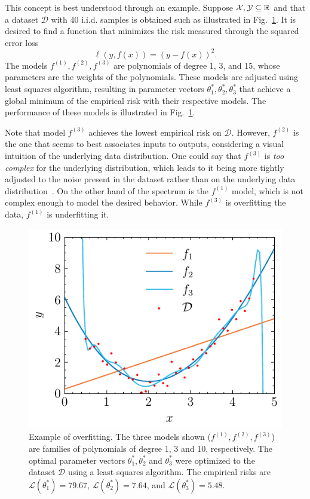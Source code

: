 This concept is best understood through an example.
Suppose $\mathcal{X},\mathcal{Y}\subseteq\mathbb{R}$ and that a dataset $\mathcal{D}$ with 40 i.i.d. samples is obtained such as illustrated in Fig.~\ref{fig:overfitting-example}.
It is desired to find a function that minimizes the risk measured through the squared error loss \[
    \ell(y,f(x)) = (y-f(x))^2
.\] 
The models $f^{(1)},f^{(2)},f^{(3)}$ are polynomials of degree 1, 3, and 15, whose parameters are the weights of the polynomials.
These models are adjusted using least squares algorithm, resulting in parameter vectors $\theta_1^*,\theta_2^*,\theta_3^*$ that achieve a global minimum of the empirical risk with their respective models.
The performance of these models is illustrated in Fig.~\ref{fig:overfitting-example}.

Note that model $f^{(3)}$ achieves the lowest empirical risk on $\mathcal{D}$.
However, $f^{(2)}$ is the one that seems to best associates inputs to outputs, considering a visual intuition of the underlying data distribution.
One could say that $f^{(3)}$ is \emph{too complex} for the underlying distribution, which leads to it being more tightly adjusted to the noise present in the dataset rather than on the underlying data distribution~\cite{murphyMachineLearningProbabilistic2013}.
On the other hand of the spectrum is the $f^{(1)}$ model, which is not complex enough to model the desired behavior.
While $f^{(3)}$ is overfitting the data, $f^{(1)}$ is underfitting it.

\begin{figure}[h]
    \centering
    \includegraphics{pictures/overfitting.pdf}
    \caption{Example of overfitting. The three models shown ($f^{(1)},f^{(2)},f^{(3)}$) are families of polynomials of degree 1, 3 and 10, respectively. The optimal parameter vectors $\theta_1^*,\theta_2^*$ and $\theta_3^*$ were optimized to the dataset $\mathcal{D}$ using a least squares algorithm. The empirical risks are $\mathcal{L}(\theta_1^*)=79.67$, $\mathcal{L}(\theta_2^*)=7.64$, and $\mathcal{L}(\theta_3^*)=5.48$.}
    \label{fig:overfitting-example}
\end{figure}

